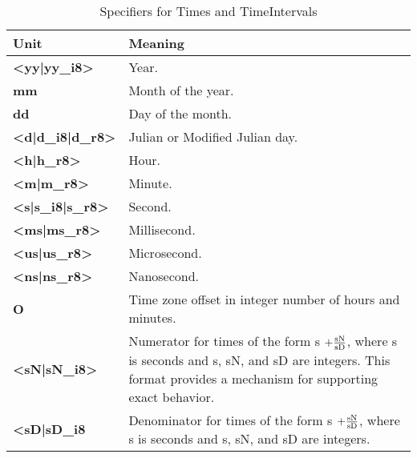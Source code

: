 \newpage
\label{table:timeOpts}
\begin{center}
\begin{table}
\caption{Specifiers for Times and TimeIntervals}
\begin{tabular}{|p{1in}|p{3.5in}|}
\hline
Unit & Meaning \\
\hline\hline
{\bf <yy|yy\_i8>} & Year. \\
\hline
{\bf mm} & Month of the year. \\
\hline
{\bf dd} & Day of the month. \\
\hline
{\bf <d|d\_i8|d\_r8>} & Julian or Modified Julian day. \\
\hline
{\bf <h|h\_r8>} & Hour. \\
\hline
{\bf <m|m\_r8>} & Minute. \\
\hline
{\bf <s|s\_i8|s\_r8>} & Second. \\
\hline
{\bf <ms|ms\_r8>} & Millisecond. \\
\hline
{\bf <us|us\_r8>} & Microsecond. \\
\hline
{\bf <ns|ns\_r8>} & Nanosecond. \\
\hline
{\bf O} & Time zone offset in integer number of hours and minutes. \\
\hline
{\bf <sN|sN\_i8>} & Numerator for times of the form s {\bf $ + 
\frac{{\rm sN}}{{\rm sD}}$}, where s is seconds and s, sN, and
sD are integers.  This format provides a mechanism for supporting
exact behavior. \\
\hline
{\bf <sD|sD\_i8} & Denominator for times of the form s {\bf $ + 
\frac{{\rm sN}}{{\rm sD}}$}, where s is seconds and s, sN, and
sD are integers. \\
\hline
\end{tabular}
\end{table}
\end{center}
